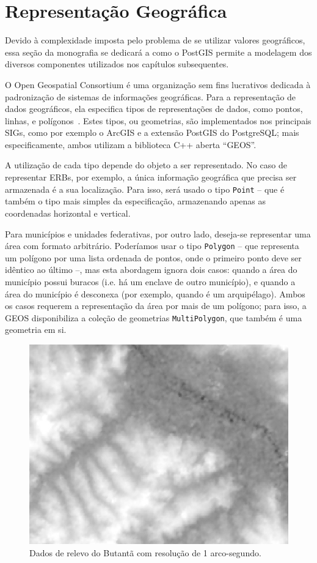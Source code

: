 \documentclass[]{politex}
\begin{document}
\section{Representação Geográfica}

Devido à complexidade imposta pelo problema de se utilizar valores geográficos,
essa seção da monografia se dedicará a como o PostGIS permite a modelagem dos
diversos componentes utilizados nos capítulos subsequentes.

O Open Geospatial Consortium é uma organização sem fins lucrativos dedicada à
padronização de sistemas de informações geográficas. Para a representação de
dados geográficos, ela especifica tipos de representações de dados, como
pontos, linhas, e polígonos~\cite{opengis}. Estes tipos, ou geometrias, são
implementados nos principais SIGs, como por exemplo o ArcGIS e a extensão
PostGIS do PostgreSQL; mais especificamente, ambos utilizam a biblioteca C++
aberta ``GEOS''.

A utilização de cada tipo depende do objeto a ser representado. No caso de
representar ERBs, por exemplo, a única informação geográfica que precisa ser
armazenada é a sua localização. Para isso, será usado o tipo \texttt{Point} --
que é também o tipo mais simples da especificação, armazenando apenas as
coordenadas horizontal e vertical.

Para municípios e unidades federativas, por outro lado, deseja-se representar
uma área com formato arbitrário. Poderíamos usar o tipo \texttt{Polygon} -- que
representa um polígono por uma lista ordenada de pontos, onde o primeiro ponto
deve ser idêntico ao último --, mas esta abordagem ignora dois casos: quando a
área do município possui buracos (i.e. há um enclave de outro município), e
quando a área do município é desconexa (por exemplo, quando é um arquipélago).
Ambos os casos requerem a representação da área por mais de um polígono; para
isso, a GEOS disponibiliza a coleção de geometrias \texttt{MultiPolygon}, que
também é uma geometria em si.

\begin{figure}[H]
    \centering
    \includegraphics[width=6in]{imagens/dados-relevo-30m}
    \caption{Dados de relevo do Butantã com resolução de 1 arco-segundo.}
    \label{fig:map_altitude_polygons}
\end{figure}
\end{document}
